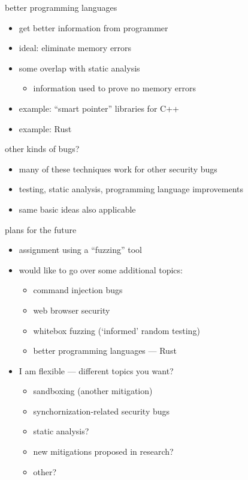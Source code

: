 
\begin{frame}{better programming languages}
    \begin{itemize}
        \item get better information from programmer
        \item ideal: eliminate memory errors 
        \item some overlap with static analysis
            \begin{itemize}
                \item information used to prove no memory errors
            \end{itemize}
        \item example: ``smart pointer'' libraries for C++
        \item example: Rust
    \end{itemize}
\end{frame}

\begin{frame}{other kinds of bugs?}
    \begin{itemize}
        \item many of these techniques work for other security bugs
        \item testing, static analysis, programming language improvements
        \item same basic ideas also applicable
    \end{itemize}
\end{frame}

\begin{frame}{plans for the future}
    \begin{itemize}
        \item assignment using a ``fuzzing'' tool
        \item would like to go over some additional topics:
            \begin{itemize}
            \item command injection bugs
            \item web browser security
            \item whitebox fuzzing (`informed' random testing)
            \item better programming languages --- Rust
            \end{itemize}
        \item I am flexible --- different topics you want?
            \begin{itemize}
            \item sandboxing (another mitigation)
            \item synchornization-related security bugs
            \item static analysis?
            \item new mitigations proposed in research?
            \item other?
            \end{itemize}
    \end{itemize}
\end{frame}
